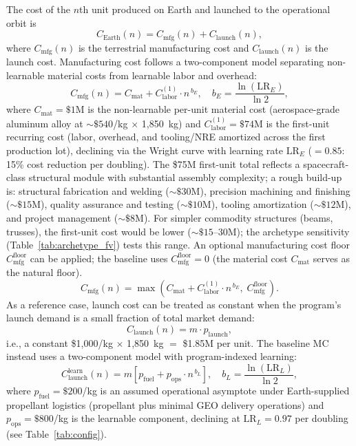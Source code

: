 \documentclass[preprint,12pt]{elsarticle}
\begin{document}
The cost of the $n$th unit produced on Earth and launched to the operational orbit is
\begin{equation}
  C_{\mathrm{Earth}}(n) = C_{\mathrm{mfg}}(n) + C_{\mathrm{launch}}(n),
  \label{eq:earth_unit}
\end{equation}
where $C_{\mathrm{mfg}}(n)$ is the terrestrial manufacturing cost and $C_{\mathrm{launch}}(n)$ is the launch cost. Manufacturing cost follows a two-component model separating non-learnable material costs from learnable labor and overhead:
\begin{equation}
  C_{\mathrm{mfg}}(n) = C_{\mathrm{mat}} + C_{\mathrm{labor}}^{(1)} \cdot n^{\,b_E}, \quad b_E = \frac{\ln(\mathrm{LR}_E)}{\ln 2},
  \label{eq:earth_mfg}
\end{equation}
where $C_{\mathrm{mat}} = \$1$M is the non-learnable per-unit material cost (aerospace-grade aluminum alloy at ${\sim}\$540$/kg $\times$ 1{,}850~kg) and $C_{\mathrm{labor}}^{(1)} = \$74$M is the first-unit recurring cost (labor, overhead, and tooling/NRE amortized across the first production lot), declining via the Wright curve with learning rate $\mathrm{LR}_E$ ($= 0.85$: 15\% cost reduction per doubling). The \$75M first-unit total reflects a spacecraft-class structural module with substantial assembly complexity; a rough build-up is: structural fabrication and welding (${\sim}\$30$M), precision machining and finishing (${\sim}\$15$M), quality assurance and testing (${\sim}\$10$M), tooling amortization (${\sim}\$12$M), and project management (${\sim}\$8$M). For simpler commodity structures (beams, trusses), the first-unit cost would be lower (${\sim}\$15$--$30$M); the archetype sensitivity (Table~\ref{tab:archetype_fv}) tests this range. An optional manufacturing cost floor $C_{\mathrm{mfg}}^{\mathrm{floor}}$ can be applied; the baseline uses $C_{\mathrm{mfg}}^{\mathrm{floor}} = 0$ (the material cost $C_{\mathrm{mat}}$ serves as the natural floor).
\begin{equation}
  C_{\mathrm{mfg}}(n) = \max\!\left(C_{\mathrm{mat}} + C_{\mathrm{labor}}^{(1)} \cdot n^{\,b_E},\; C_{\mathrm{mfg}}^{\mathrm{floor}}\right).
  \label{eq:earth_mfg_floor}
\end{equation}
As a reference case, launch cost can be treated as constant when the program's launch demand is a small fraction of total market demand:
\begin{equation}
  C_{\mathrm{launch}}(n) = m \cdot p_{\mathrm{launch}},
  \label{eq:earth_launch_baseline}
\end{equation}
i.e., a constant \$1{,}000/kg $\times$ 1{,}850~kg $=$ \$1.85M per unit. The baseline MC instead uses a two-component model with program-indexed learning:
\begin{equation}
  C_{\mathrm{launch}}^{\mathrm{learn}}(n) = m \left[ p_{\mathrm{fuel}} + p_{\mathrm{ops}} \cdot n^{\,b_L} \right], \quad b_L = \frac{\ln(\mathrm{LR}_L)}{\ln 2},
  \label{eq:earth_launch_learn}
\end{equation}
where $p_{\mathrm{fuel}} = \$200$/kg is an assumed operational asymptote under Earth-supplied propellant logistics (propellant plus minimal GEO delivery operations) and $p_{\mathrm{ops}} = \$800$/kg is the learnable component, declining at $\mathrm{LR}_L = 0.97$ per doubling (see Table~\ref{tab:config}).
\end{document}
